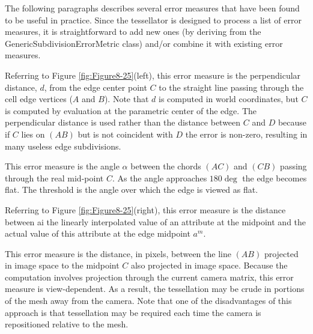 The following paragraphs describes several error measures that have been found to be useful in practice. Since the tessellator is designed to process a list of error measures, it is straightforward to add new ones (by deriving from the GenericSubdivisionErrorMetric class) and/or combine it with existing error measures.
\begin{description}[leftmargin=0cm,labelindent=0cm]

    \item [\textit{Object-Based Geometric Error Measure.}] Referring to Figure \ref{fig:Figure8-25}(left), this error measure is the perpendicular distance, $d$, from the edge center point $C$ to the straight line passing through the cell edge vertices ($A$ and $B$). Note that $d$ is computed in world coordinates, but $C$ is computed by evaluation at the parametric center of the edge. The perpendicular distance is used rather than the distance between $C$ and $D$ because if $C$ lies on $(AB)$ but is not coincident with $D$ the error is non-zero, resulting in many useless edge subdivisions.

    \item [\textit{Object-Based Flatness Error Measure.}] This error measure is the angle $\alpha$ between the chords $(AC)$ and $(CB)$ passing through the real mid-point $C$. As the angle approaches $180\deg$ the edge becomes flat. The threshold is the angle over which the edge is viewed as flat.

    \item [\textit{Attribute-Based Error Measure.}] Referring to Figure \ref{fig:Figure8-25}(right), this error measure is the distance between ai the linearly interpolated value of an attribute at the midpoint and the actual value of this attribute at the edge midpoint $a^m$.

    \item [\textit{Image-Based Geometric Error Measure.}] This error measure is the distance, in pixels, between the line $(AB)$ projected in image space to the midpoint $C$ also projected in image space. Because the computation involves projection through the current camera matrix, this error measure is view-dependent. As a result, the tessellation may be crude in portions of the mesh away from the camera. Note that one of the disadvantages of this approach is that tessellation may be required each time the camera is repositioned relative to the mesh.

\end{description}

